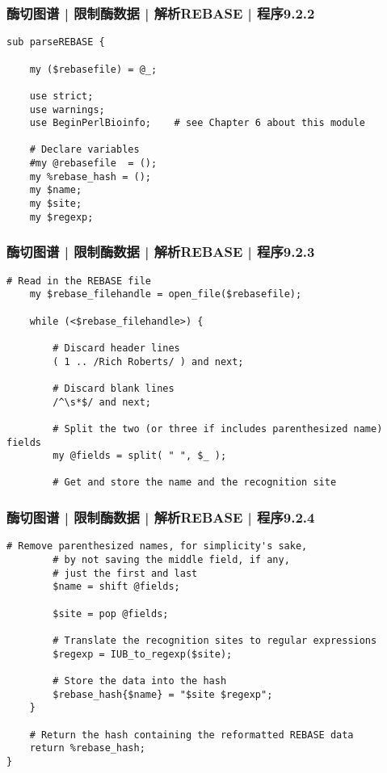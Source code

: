 \begin{frame}[fragile]
  \frametitle{酶切图谱 | 限制酶数据 | 解析REBASE | 程序9.2.2}
\begin{lstlisting}[firstnumber=8]
sub parseREBASE {

    my ($rebasefile) = @_;

    use strict;
    use warnings;
    use BeginPerlBioinfo;    # see Chapter 6 about this module

    # Declare variables
    #my @rebasefile  = ();
    my %rebase_hash = ();
    my $name;
    my $site;
    my $regexp;
\end{lstlisting}
\end{frame}

\begin{frame}[fragile]
  \frametitle{酶切图谱 | 限制酶数据 | 解析REBASE | 程序9.2.3}
  \vspace{-0.6em}
\begin{lstlisting}[firstnumber=23,basicstyle=\small\tt,numberstyle=\footnotesize]
    # Read in the REBASE file
    my $rebase_filehandle = open_file($rebasefile);

    while (<$rebase_filehandle>) {

        # Discard header lines
        ( 1 .. /Rich Roberts/ ) and next;

        # Discard blank lines
        /^\s*$/ and next;

        # Split the two (or three if includes parenthesized name) fields
        my @fields = split( " ", $_ );

        # Get and store the name and the recognition site
\end{lstlisting}
\end{frame}

\begin{frame}[fragile]
  \frametitle{酶切图谱 | 限制酶数据 | 解析REBASE | 程序9.2.4}
  \vspace{-0.8em}
\begin{lstlisting}[firstnumber=39,basicstyle=\footnotesize\tt,numberstyle=\scriptsize]
        # Remove parenthesized names, for simplicity's sake,
        # by not saving the middle field, if any,
        # just the first and last
        $name = shift @fields;

        $site = pop @fields;

        # Translate the recognition sites to regular expressions
        $regexp = IUB_to_regexp($site);

        # Store the data into the hash
        $rebase_hash{$name} = "$site $regexp";
    }

    # Return the hash containing the reformatted REBASE data
    return %rebase_hash;
}
\end{lstlisting}
\end{frame}

